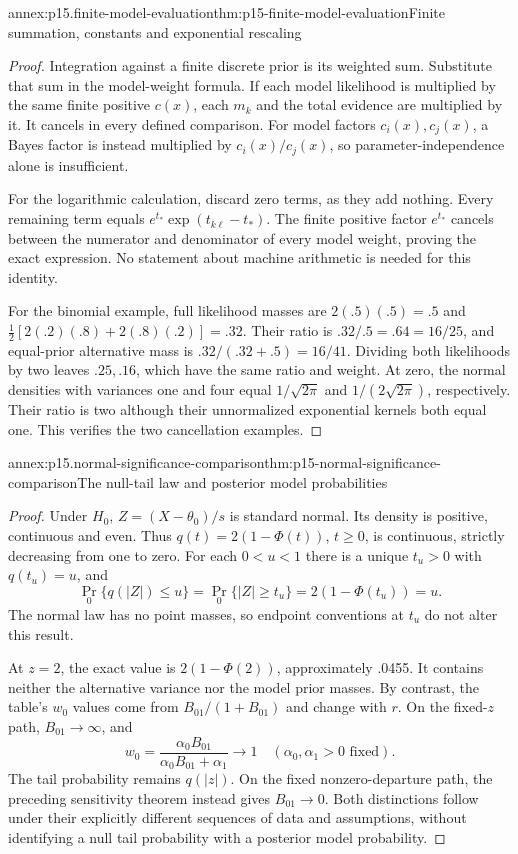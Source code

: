 \begin{annexitem}{annex:p15.finite-model-evaluation}{thm:p15-finite-model-evaluation}{Finite summation, constants and exponential rescaling}
\begin{proof}
Integration against a finite discrete prior is its weighted sum. Substitute
that sum in the model-weight formula. If each model likelihood is multiplied
by the same finite positive \(c(x)\), each \(m_k\) and the total evidence
are multiplied by it. It cancels in every defined comparison. For model
factors \(c_i(x),c_j(x)\), a Bayes factor is instead multiplied by
\(c_i(x)/c_j(x)\), so parameter-independence alone is insufficient.

For the logarithmic calculation, discard zero terms, as they add nothing.
Every remaining term equals
\(e^{t_*}\exp(t_{k\ell}-t_*)\). The finite positive factor \(e^{t_*}\)
cancels between the numerator and denominator of every model weight,
proving the exact expression. No statement about machine arithmetic
is needed for this identity.

For the binomial example, full likelihood masses are
\(2(.5)(.5)=.5\) and
\(\tfrac12[2(.2)(.8)+2(.8)(.2)]=.32\).
Their ratio is \(.32/.5=.64=16/25\), and equal-prior alternative mass is
\(.32/(.32+.5)=16/41\). Dividing both likelihoods by two leaves
\(.25,.16\), which have the same ratio and weight.
At zero, the normal densities with variances one and four equal
\(1/\sqrt{2\pi}\) and \(1/(2\sqrt{2\pi})\), respectively.
Their ratio is two although their unnormalized exponential kernels
both equal one. This verifies the two cancellation examples.
\end{proof}
\end{annexitem}

\begin{annexitem}{annex:p15.normal-significance-comparison}{thm:p15-normal-significance-comparison}{The null-tail law and posterior model probabilities}
\begin{proof}
Under \(H_0\), \(Z=(X-\theta_0)/s\) is standard normal. Its density is
positive, continuous and even. Thus \(q(t)=2(1-\Phi(t))\), \(t\geq0\),
is continuous, strictly decreasing from one to zero. For each \(0<u<1\)
there is a unique \(t_u>0\) with \(q(t_u)=u\), and
\[
 \Pr_0\{q(|Z|)\leq u\}
 =\Pr_0\{|Z|\geq t_u\}=2(1-\Phi(t_u))=u.
\]
The normal law has no point masses, so endpoint conventions at \(t_u\)
do not alter this result.

At \(z=2\), the exact value is \(2(1-\Phi(2))\), approximately .0455.
It contains neither the alternative variance nor the model prior masses.
By contrast, the table's \(w_0\) values come from
\(B_{01}/(1+B_{01})\) and change with \(r\).
On the fixed-\(z\) path, \(B_{01}\to\infty\), and
\[
 w_0=\frac{\alpha_0B_{01}}{\alpha_0B_{01}+\alpha_1}\longrightarrow1
 \quad(\alpha_0,\alpha_1>0\text{ fixed}).
\]
The tail probability remains \(q(|z|)\). On the fixed nonzero-departure
path, the preceding sensitivity theorem instead gives \(B_{01}\to0\).
Both distinctions follow under their explicitly different sequences of
data and assumptions, without identifying a null tail probability with
a posterior model probability.
\end{proof}
\end{annexitem}
